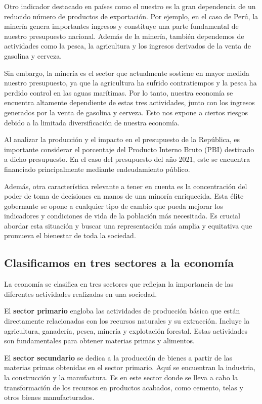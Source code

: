 \documentclass[
  jou,
  floatsintext,
  longtable,
  a4paper,
  nolmodern,
  notxfonts,
  notimes,
  12pt,
  colorlinks=true,linkcolor=blue,citecolor=blue,urlcolor=blue]{apa7}
\begin{document}
Otro indicador destacado en países como el nuestro es la gran
dependencia de un reducido número de productos de exportación. Por
ejemplo, en el caso de Perú, la minería genera importantes ingresos y
constituye una parte fundamental de nuestro presupuesto nacional. Además
de la minería, también dependemos de actividades como la pesca, la
agricultura y los ingresos derivados de la venta de gasolina y cerveza.

Sin embargo, la minería es el sector que actualmente sostiene en mayor
medida nuestro presupuesto, ya que la agricultura ha sufrido
contratiempos y la pesca ha perdido control en las aguas marítimas. Por
lo tanto, nuestra economía se encuentra altamente dependiente de estas
tres actividades, junto con los ingresos generados por la venta de
gasolina y cerveza. Esto nos expone a ciertos riesgos debido a la
limitada diversificación de nuestra economía.

Al analizar la producción y el impacto en el presupuesto de la
República, es importante considerar el porcentaje del Producto Interno
Bruto (PBI) destinado a dicho presupuesto. En el caso del presupuesto
del año 2021, este se encuentra financiado principalmente mediante
endeudamiento público.

Además, otra característica relevante a tener en cuenta es la
concentración del poder de toma de decisiones en manos de una minoría
enriquecida. Esta élite gobernante se opone a cualquier tipo de cambio
que pueda mejorar los indicadores y condiciones de vida de la población
más necesitada. Es crucial abordar esta situación y buscar una
representación más amplia y equitativa que promueva el bienestar de toda
la sociedad.

\subsection{Clasificamos en tres sectores a la
economía}\label{clasificamos-en-tres-sectores-a-la-economuxeda}

La economía se clasifica en tres sectores que reflejan la importancia de
las diferentes actividades realizadas en una sociedad.

El \textbf{sector primario} engloba las actividades de producción básica
que están directamente relacionadas con los recursos naturales y su
extracción. Incluye la agricultura, ganadería, pesca, minería y
explotación forestal. Estas actividades son fundamentales para obtener
materias primas y alimentos.

El \textbf{sector secundario} se dedica a la producción de bienes a
partir de las materias primas obtenidas en el sector primario. Aquí se
encuentran la industria, la construcción y la manufactura. Es en este
sector donde se lleva a cabo la transformación de los recursos en
productos acabados, como cemento, telas y otros bienes manufacturados.
\end{document}

